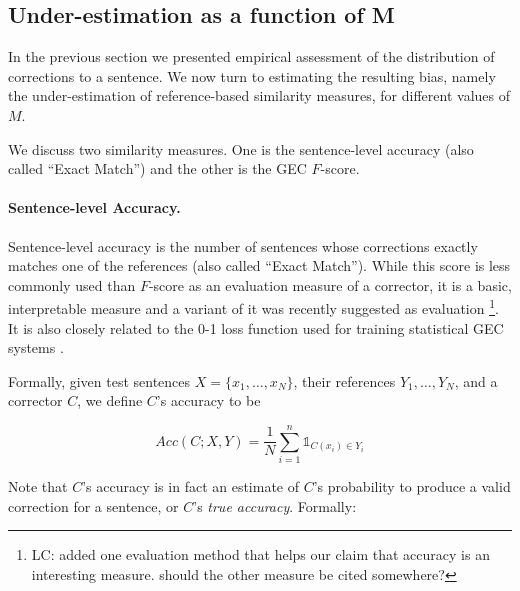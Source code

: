 \documentclass[letter,11pt]{article}
\newcommand{\lc}[1]{\footnote{\color{green}LC: #1}}
\begin{document}
		\subsection{Under-estimation as a function of M} \label{subsec:Assessment-values}
		
		In the previous section we presented empirical assessment of the distribution of
		corrections to a sentence. We now turn to estimating the resulting bias, namely
                the under-estimation of reference-based similarity measures, for different values of $M$.
		
		We discuss two similarity measures. One is the sentence-level accuracy
                (also called ``Exact Match'') and the other is the GEC $F$-score.
		
		\paragraph{Sentence-level Accuracy.}
		Sentence-level accuracy is the number of sentences whose corrections
                exactly matches one of the references (also called ``Exact Match'').
                While this score is less
                commonly used than $F$-score as an evaluation
		measure of a corrector, it is a basic, interpretable measure and a variant of it was recently suggested as evaluation \cite{felice2015towards}\lc{added one evaluation method that helps our claim that accuracy is an interesting measure.
                  should the other measure be cited somewhere?}. It is also closely related to the 0-1 loss function used
                for training statistical GEC systems \cite{chodorow2012problems,rozovskaya2013joint}. 
		
		Formally, given test sentences $X=\{x_1,\ldots,x_N\}$,
		their references $Y_1,\ldots,Y_N$, and a corrector $C$,
                we define $C$'s accuracy to be

		\begin{equation*}
		Acc(C;X,Y) = \frac{1}{N} \sum_{i=1}^n \mathds{1}_{C(x_i) \in Y_i}
		\end{equation*}

                Note that $C$'s accuracy is in fact an estimate of $C$'s probability to produce
                a valid correction for a sentence, or $C$'s {\it true accuracy}. Formally:
\end{document}
